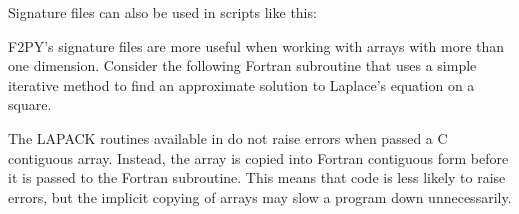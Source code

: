 Signature files can also be used in  scripts like this:


F2PY's signature files are more useful when working with arrays with more than one dimension.
Consider the following Fortran subroutine that uses a simple iterative method to find an approximate solution to Laplace's equation on a square.




\begin{warn}
The LAPACK routines available in  do not raise errors when passed a C contiguous array.
Instead, the array is copied into Fortran contiguous form before it is passed to the Fortran subroutine.
This means that code is less likely to raise errors, but the implicit copying of arrays may slow a program down unnecessarily.
\end{warn}


